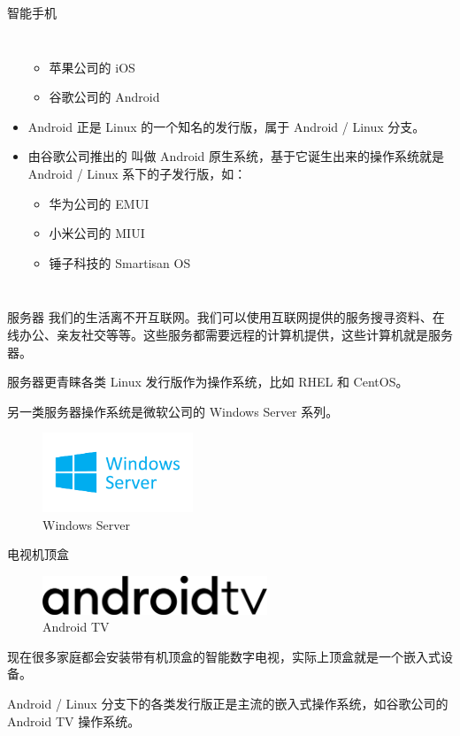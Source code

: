 \documentclass[UTF8]{ctexbeamer}
\begin{document}
\begin{frame}{智能手机}
\begin{columns}
\begin{itemize}
        \begin{itemize}
            \item 苹果公司的 iOS
            \item 谷歌公司的 Android
        \end{itemize}
        \item Android 正是 Linux 的一个知名的发行版，属于 Android / Linux 分支。
        \item 由谷歌公司推出的 叫做 Android 原生系统，基于它诞生出来的操作系统就是 Android / Linux 系下的子发行版，如：
        \begin{itemize}
            \item 华为公司的 EMUI
            \item 小米公司的 MIUI
            \item 锤子科技的 Smartisan OS
        \end{itemize}
    \end{itemize}
    \end{columns}
    
\end{frame}
\begin{frame}{服务器}
    我们的生活离不开互联网。我们可以使用互联网提供的服务搜寻资料、在线办公、亲友社交等等。这些服务都需要远程的计算机提供，这些计算机就是服务器。
    
    服务器更青睐各类 Linux 发行版作为操作系统，比如 RHEL 和 CentOS。
    
    另一类服务器操作系统是微软公司的 Windows Server 系列。
    
    \begin{figure}
        \centering
        \includegraphics[width=0.4\textwidth]{windows-server-logo.png}
        \caption{Windows Server}
        \label{fig:windows-server}
    \end{figure}
\end{frame}
\begin{frame}{电视机顶盒}
    
    \begin{figure}
        \centering
        \includegraphics[width=0.6\textwidth]{androidtv.png}
        \caption{Android TV}
        \label{fig:androidtv}
    \end{figure}
    现在很多家庭都会安装带有机顶盒的智能数字电视，实际上顶盒就是一个嵌入式设备。

    Android / Linux 分支下的各类发行版正是主流的嵌入式操作系统，如谷歌公司的 Android TV 操作系统。
\end{frame}
\end{document}
